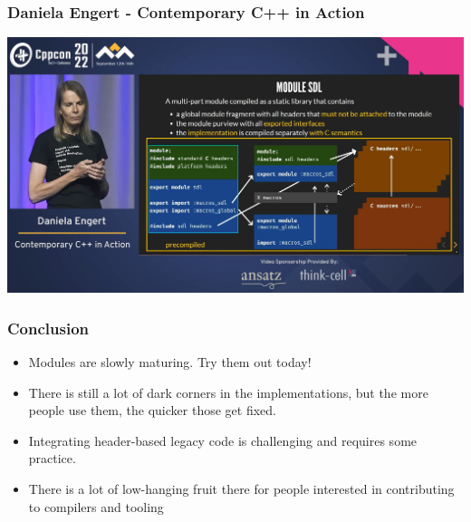\documentclass[aspectratio=169]{beamer}
\begin{document}
\begin{frame}
  \frametitle{Daniela Engert - Contemporary C++ in Action}
  \begin{center}
    \href{https://www.youtube.com/watch?v=yUIFdL3D0Vk}
    {\includegraphics[height=.8\textheight]{modulesgfx/engert_contemporary.jpg}}
  \end{center}
\end{frame}


\begin{frame}
  \frametitle{Conclusion}

  \begin{itemize}
  \item Modules are slowly maturing. Try them out today!
  \item There is still a lot of dark corners in the implementations, but the more people use them, the quicker those get fixed.
  \item Integrating header-based legacy code is challenging and requires some
  practice.
  \item \alert<2>{There is a lot of low-hanging fruit there for people interested in contributing to compilers and tooling}
  \end{itemize}

\end{frame}
\end{document}
